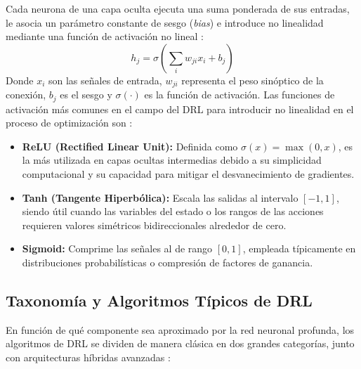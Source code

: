 Cada neurona de una capa oculta ejecuta una suma ponderada de sus entradas, le asocia un parámetro constante de sesgo (\textit{bias}) e introduce no linealidad mediante una función de activación no lineal \citep{shakya2023reinforcement}:
\begin{equation}
    h_j = \sigma\left( \sum_{i} w_{ji} x_i + b_j \right)
\end{equation}
Donde $x_i$ son las señales de entrada, $w_{ji}$ representa el peso sinóptico de la conexión, $b_j$ es el sesgo y $\sigma(\cdot)$ es la función de activación. Las funciones de activación más comunes en el campo del DRL para introducir no linealidad en el proceso de optimización son \citep{shakya2023reinforcement}:
\begin{itemize}
    \item \textbf{ReLU (Rectified Linear Unit):} Definida como $\sigma(x) = \max(0, x)$, es la más utilizada en capas ocultas intermedias debido a su simplicidad computacional y su capacidad para mitigar el desvanecimiento de gradientes.
    \item \textbf{Tanh (Tangente Hiperbólica):} Escala las salidas al intervalo $[-1, 1]$, siendo útil cuando las variables del estado o los rangos de las acciones requieren valores simétricos bidireccionales alrededor de cero.
    \item \textbf{Sigmoid:} Comprime las señales al de rango $[0, 1]$, empleada típicamente en distribuciones probabilísticas o compresión de factores de ganancia.
\end{itemize}



\subsection{Taxonomía y Algoritmos Típicos de DRL}
En función de qué componente sea aproximado por la red neuronal profunda, los algoritmos de DRL se dividen de manera clásica en dos grandes categorías, junto con arquitecturas híbridas avanzadas \citep{shakya2023reinforcement}:

